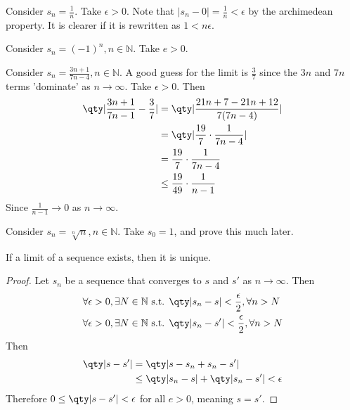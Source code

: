 \documentclass[../notes.tex]{subfiles}
\begin{document}
\begin{example}
	Consider $s_n = \frac{1}{n}$. Take $\epsilon > 0$. Note that $|s_n - 0| = \frac{1}{n} < \epsilon$ by the archimedean property. It is clearer if it is rewritten as $1 < n \epsilon$.
\end{example}

\begin{example}
	Consider $s_n = (-1)^n, n \in \mathbb{N}$. Take $e > 0$. %
\end{example}

\begin{example}
	Consider $s_n = \frac{3n +1}{7n-4}, n \in \mathbb{N}$. A good guess for the limit is $\frac{3}{7}$ since the $3n$ and $7n$ terms 'dominate' as $n \to \infty$. Take $\epsilon > 0$. Then
	\begin{align*}
		\qty|\frac{3n+1}{7n-1} - \frac{3}{7}| &= \qty| \frac{21n + 7 - 21n + 12}{7(7n-4)} | \\
											  &= \qty| \frac{19}{7} \cdot \frac{1}{7n-4} | \\
											  &= \frac{19}{7} \cdot \frac{1}{7n-4} \\
											  &\leq \frac{19}{49} \cdot \frac{1}{n - 1}
	\end{align*}
	Since $\frac{1}{n-1} \to 0$ as $n \to \infty$. %
\end{example}

\begin{example}
	Consider $s_n = \sqrt[n]{n}, n \in \mathbb{N}$. Take $s_0 = 1$, and prove this much later.
\end{example}

\begin{theorem}
	If a limit of a sequence exists, then it is unique.
\end{theorem}

\begin{proof}
	Let $s_n$ be a sequence that converges to $s$ and $s'$ as $n \to \infty$. Then
	\begin{align*}
		\forall \epsilon > 0, \exists N \in \mathbb{N} \text{ s.t. } &\qty|s_n - s| < \frac{\epsilon}{2}, \forall n > N \\
		\forall \epsilon > 0, \exists N \in \mathbb{N} \text{ s.t. } &\qty|s_n - s'| < \frac{\epsilon}{2}, \forall n > N \\
	\end{align*}
	Then
	\begin{align*}
		\qty|s - s'| &= \qty|s - s_n + s_n - s'| \\
					 &\leq \qty|s_n - s| + \qty|s_n - s'| < \epsilon
	\end{align*}
	Therefore $0 \leq \qty|s - s'| < \epsilon$ for all $e > 0$, meaning $s = s'$.
\end{proof}
\end{document}
